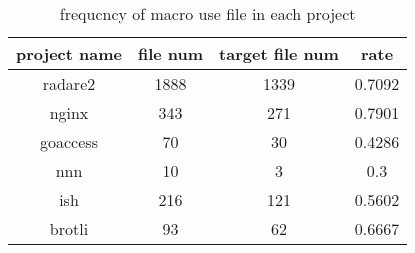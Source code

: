\begin{table}[h]
	\caption{frequcncy of macro use file in each project}
	\label{table:frequency_of_macro_use_file_in_each_project}	
		\begin{tabular}{cccc}
		\hline
		project name & file num & target file num & rate \\ 
		\hline \hline
		radare2 & 1888 & 1339 & 0.7092 \\ 
		\hline
		nginx & 343 & 271 & 0.7901 \\ 
		\hline
		goaccess & 70 & 30 & 0.4286 \\ 
		\hline
		nnn & 10 & 3 & 0.3 \\ 
		\hline
		ish & 216 & 121 & 0.5602 \\ 
		\hline
		brotli & 93 & 62 & 0.6667 \\ 
		\hline
	\end{tabular}
\end{table}